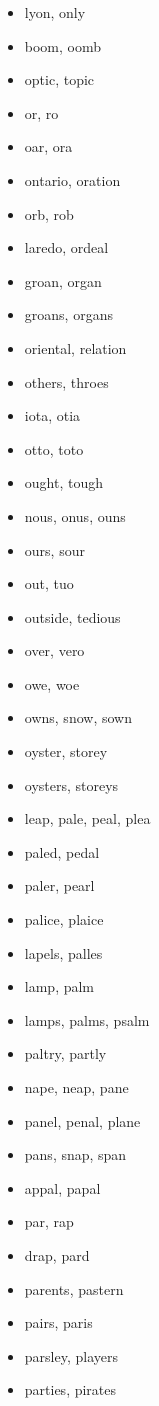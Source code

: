 \documentclass[a4wide,11pt]{report}
\begin{document}
\begin{itemize}
  \item lyon, only
  \item boom, oomb
  \item optic, topic
  \item or, ro
  \item oar, ora
  \item ontario, oration
  \item orb, rob
  \item laredo, ordeal
  \item groan, organ
  \item groans, organs
  \item oriental, relation
  \item others, throes
  \item iota, otia
  \item otto, toto
  \item ought, tough
  \item nous, onus, ouns
  \item ours, sour
  \item out, tuo
  \item outside, tedious
  \item over, vero
  \item owe, woe
  \item owns, snow, sown
  \item oyster, storey
  \item oysters, storeys
  \item leap, pale, peal, plea
  \item paled, pedal
  \item paler, pearl
  \item palice, plaice
  \item lapels, palles
  \item lamp, palm
  \item lamps, palms, psalm
  \item paltry, partly
  \item nape, neap, pane
  \item panel, penal, plane
  \item pans, snap, span
  \item appal, papal
  \item par, rap
  \item drap, pard
  \item parents, pastern
  \item pairs, paris
  \item parsley, players
  \item parties, pirates

\end{itemize}
\end{document}
